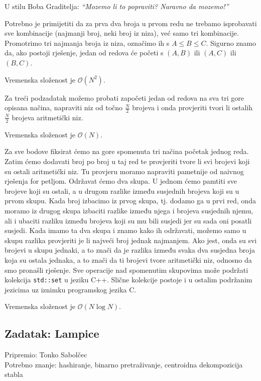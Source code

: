 \documentclass[a4paper]{article}
\begin{document}
U stilu Boba Graditelja: \emph{“Mozemo li to popraviti? Naravno da mozemo!”}

Potrebno je primijetiti da za prva dva broja u prvom redu ne trebamo isprobavati
sve kombinacije (najmanji broj, neki broj iz niza), već samo tri kombinacije.
Promotrimo tri najmanja broja iz niza, označimo ih s $A \le B \le C$. Sigurno
znamo da, ako postoji rješenje, jedan od redova će početi s $(A, B)$ ili $(A, C)$
ili $(B, C)$.

Vremenska složenost je $\mathcal{O}(N^2)$.

Za treći podzadatak možemo probati započeti jedan od redova na sva tri gore
opisana načina, napraviti niz od točno $\frac{N}{2}$ brojeva i onda provjeriti
tvori li ostalih $\frac{N}{2}$ brojeva aritmetički niz.

Vremenska složenost je $\mathcal{O}(N)$.

Za sve bodove fiksirat ćemo na gore spomenuta tri načina početak jednog reda.
Zatim ćemo dodavati broj po broj u taj red te provjeriti tvore li svi brojevi
koji su ostali aritmetički niz. Tu provjeru moramo napraviti pametnije od
naivnog rješenja for petljom. Održavat ćemo dva skupa. U jednom ćemo pamtiti sve
brojeve koji su ostali, a u drugom razlike između susjednih brojeva koji su u
prvom skupu. Kada broj izbacimo iz prvog skupa, tj. dodamo ga u prvi red, onda
moramo iz drugog skupa izbaciti razlike između njega i brojeva susjednih njemu,
ali i ubaciti razliku između brojeva koji su mu bili susjedi jer su sada oni
posatli susjedi. Kada imamo ta dva skupa i znamo kako ih održavati, možemo samo
u skupu razlika provjeriti je li najveći broj jednak najmanjem. Ako jest, onda
su svi brojevi u skupu jednaki, a to znači da je razlika između svaka dva
susjedna broja koja su ostala jednaka, a to znači da ti brojevi tvore
aritmetički niz, odnosno da smo pronašli rješenje. Sve operacije nad
spomenutim skupovima može podržati kolekcija \texttt{std::set} u jeziku
C++. Slične kolekcije postoje i u ostalim podržanim jezicima uz iznimku
programskog jezika C.

Vremenska složenost je $\mathcal{O}(N \log N)$.

\subsection*{Zadatak: Lampice}
\textsf{Pripremio: Tonko Sabolčec}\\
\textsf{Potrebno znanje: hashiranje, binarno pretraživanje, centroidna
dekompozicija stabla}
\end{document}
